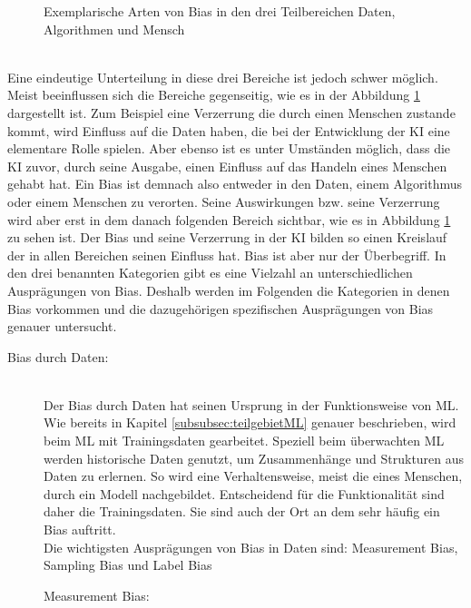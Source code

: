 \begin{onehalfspace}
\begin{figure}[h]
            \caption{Exemplarische Arten von Bias in den drei Teilbereichen Daten, Algorithmen und Mensch \cite{Mehrabi2021}}
            \label{fig:BiasCycle}
        \end{figure}\\
        Eine eindeutige Unterteilung in diese drei Bereiche ist jedoch schwer möglich. Meist beeinflussen sich die Bereiche gegenseitig, wie es in der Abbildung \ref*{fig:BiasCycle} dargestellt ist. Zum Beispiel eine Verzerrung die durch einen Menschen zustande kommt, wird Einfluss auf die Daten haben, die bei der Entwicklung der \ac{KI} eine elementare Rolle spielen. Aber ebenso ist es unter Umständen möglich, dass die \ac{KI} zuvor, durch seine Ausgabe, einen Einfluss auf das Handeln eines Menschen gehabt hat.\cite{Mehrabi2021} Ein Bias ist demnach also entweder in den Daten, einem Algorithmus oder einem Menschen zu verorten. Seine Auswirkungen bzw. seine Verzerrung wird aber erst in dem danach folgenden Bereich sichtbar, wie es in Abbildung \ref*{fig:BiasCycle} zu sehen ist. Der Bias und seine Verzerrung in der \ac*{KI} bilden so einen Kreislauf der in allen Bereichen seinen Einfluss hat.\cite*[]{Mehrabi2021}
        Bias ist aber nur der Überbegriff. In den drei benannten Kategorien gibt es eine Vielzahl an unterschiedlichen Ausprägungen von Bias. Deshalb werden im Folgenden die Kategorien in denen Bias vorkommen und die dazugehörigen spezifischen Ausprägungen von Bias genauer untersucht.
        \begin{description}
            \item [Bias durch Daten:]\hfill \\
            Der Bias durch Daten hat seinen Ursprung in der Funktionsweise von \ac{ML}. Wie bereits in Kapitel \ref{subsubsec:teilgebietML} genauer beschrieben, wird beim \ac{ML} mit Trainingsdaten gearbeitet. Speziell beim überwachten \ac*{ML} werden historische Daten genutzt, um Zusammenhänge und Strukturen aus Daten zu erlernen. So wird eine Verhaltensweise, meist die eines Menschen, durch ein Modell nachgebildet. Entscheidend für die Funktionalität sind daher die Trainingsdaten. Sie sind auch der Ort an dem sehr häufig ein Bias auftritt.\cite{silberg2019notes}\cite{Drew2019}
            \\
            Die wichtigsten Ausprägungen von Bias in Daten sind: Measurement Bias, Sampling Bias und Label Bias\cite{srinivasan2021biases}\cite{Mehrabi2021}
            \begin{description}
                \item [Measurement Bias:] \hfill \\

\end{description}
\end{description}
\end{onehalfspace}
